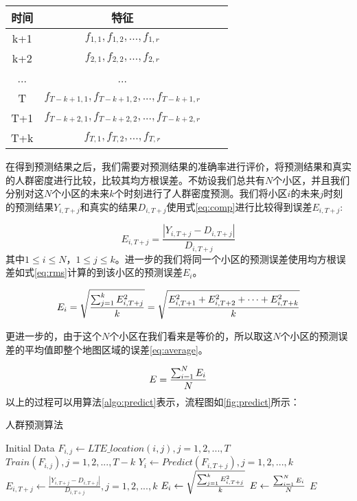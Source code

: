 \begin{table}[!hpb]
    \centering
    \begin{tabular}{@{}cccc@{}} \toprule
        时间 & 特征 \\ \midrule
        k+1 & $f_{1,1},f_{1,2},...,f_{1,r}$ \\
        k+2 & $f_{2,1},f_{2,2},...,f_{2,r}$ \\
        ... & ... \\
        T & $f_{T-k+1,1},f_{T-k+1,2},...,f_{T-k+1,r}$ \\ 
        T+1 & $f_{T-k+2,1},f_{T-k+2,2},...,f_{T-k+2,r}$ \\
        T+k & $f_{T,1},f_{T,2},...,f_{T,r}$ \\ \bottomrule
    \end{tabular}
\end{table}

在得到预测结果之后，我们需要对预测结果的准确率进行评价，将预测结果和真实的人群密度进行比较，比较其均方根误差。不妨设我们总共有$N$个小区，并且我们分别对这$N$个小区的未来$k$个时刻进行了人群密度预测。我们将小区$i$的未来$j$时刻的预测结果$Y_{i,T+j}$和真实的结果$D_{i,T+j}$使用式\ref{eq:comp}进行比较得到误差$E_{i,T+j}$:

\begin{equation}
    \label{eq:comp}
    E_{i,T+j}=\frac{|Y_{i,T+j}-D_{i,T+j}|}{D_{i,T+j}}
\end{equation}
其中$1 \leq i \leq N$，$1 \leq j \leq k$。进一步的我们将同一个小区的预测误差使用均方根误差如式\ref{eq:rms}计算的到该小区的预测误差$E_i$。

\begin{equation}
    \label{eq:rms}
    E_i={\sqrt  {\sum _{{j=1}}^{k}E_{i,T+j}^{2} \over k}}={\sqrt  {E_{i,T+1}^{2}+E_{i,T+2}^{2}+\cdots +E_{i,T+k}^{2} \over k}}
\end{equation}

更进一步的，由于这个$N$个小区在我们看来是等价的，所以取这$N$个小区的预测误差的平均值即整个地图区域的误差\ref{eq:average}。

\begin{equation}
    \label{eq:average}
    E={\sum _{{i=1}}^{N}E_{i} \over N}
\end{equation}
以上的过程可以用算法\ref{algo:predict}表示，流程图如\ref{fig:predict}所示：

\begin{algorithm}
    \caption{人群预测算法}
    \label{algo:predict}
    \begin{algorithmic}[1]
    \State Initial Data
        \State $F_{i,j} \gets LTE\_location(i,j), j=1,2,...,T$
        \State $Train(F_{i,j}), j=1,2,...,T-k$
        \State $Y_i \gets Predict(F_{i,T+j}), j=1,2,...,k$
        \State $E_{i,T+j} \gets \frac{|Y_{i,T+j}-D_{i,T+j}|}{D_{i,T+j}}, j=1,2,...,k$
        \State $E_i \gets {\sqrt  {\sum _{{j=1}}^{k}E_{i,T+j}^{2} \over k}}$
    \EndFor
    \State $E \gets {\sum _{{i=1}}^{N}E_{i} \over N}$
    \State 
    \Return $E$
    \end{algorithmic}
\end{algorithm}

